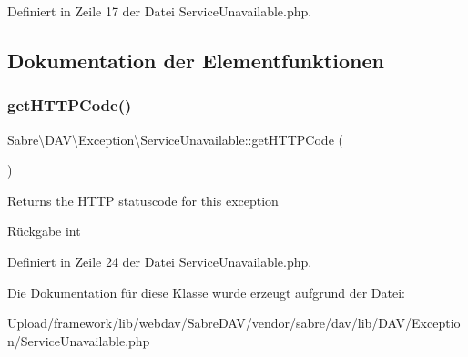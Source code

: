 Definiert in Zeile 17 der Datei Service\+Unavailable.\+php.



\subsection{Dokumentation der Elementfunktionen}
\mbox{\label{class_sabre_1_1_d_a_v_1_1_exception_1_1_service_unavailable_ae8c3c16f888a0fec458229e94f56d614}} 
\subsubsection{\texorpdfstring{get\+H\+T\+T\+P\+Code()}{getHTTPCode()}}
{\footnotesize\ttfamily Sabre\textbackslash{}\+D\+A\+V\textbackslash{}\+Exception\textbackslash{}\+Service\+Unavailable\+::get\+H\+T\+T\+P\+Code (\begin{DoxyParamCaption}{ }\end{DoxyParamCaption})}

Returns the H\+T\+TP statuscode for this exception

\begin{DoxyReturn}{Rückgabe}
int 
\end{DoxyReturn}


Definiert in Zeile 24 der Datei Service\+Unavailable.\+php.



Die Dokumentation für diese Klasse wurde erzeugt aufgrund der Datei\+:\begin{DoxyCompactItemize}
\item 
Upload/framework/lib/webdav/\+Sabre\+D\+A\+V/vendor/sabre/dav/lib/\+D\+A\+V/\+Exception/Service\+Unavailable.\+php\end{DoxyCompactItemize}
